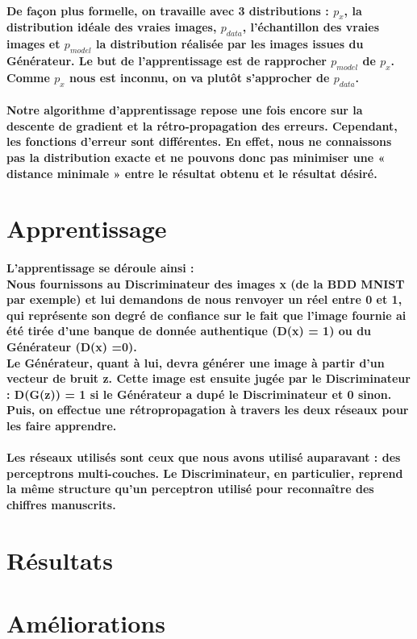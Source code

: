 \paragraph{De façon plus formelle, on travaille avec 3 distributions : $p_x$, la distribution idéale des vraies images, $p_{data}$, l’échantillon des vraies images et $p_{model}$ la distribution réalisée par les images issues du Générateur. Le but de l’apprentissage est de rapprocher $p_{model}$ de $p_x$. Comme $p_x$ nous est inconnu, on va plutôt s'approcher de $p_{data}$. }

\paragraph{Notre algorithme d’apprentissage repose une fois encore sur la descente de gradient et la rétro-propagation des erreurs. Cependant, les fonctions d’erreur sont différentes. En effet, nous ne connaissons pas la distribution exacte et ne pouvons donc pas minimiser une « distance minimale » entre le résultat obtenu et le résultat désiré. }

\section{Apprentissage}
\paragraph{L’apprentissage se déroule ainsi :\\
Nous fournissons au Discriminateur des images x (de la BDD MNIST par exemple) et lui demandons de nous renvoyer un réel entre 0 et 1, qui représente son degré de confiance sur le fait que l’image fournie ai été tirée d’une banque de donnée authentique (D(x) = 1) ou du Générateur (D(x) =0).\\
Le Générateur, quant à lui, devra générer une image à partir d’un vecteur de bruit z. Cette image est ensuite jugée par le Discriminateur : D(G(z)) = 1 si le Générateur a dupé le Discriminateur et 0 sinon. Puis, on effectue une rétropropagation à travers les deux réseaux pour les faire apprendre.}
\paragraph{
Les réseaux utilisés sont ceux que nous avons utilisé auparavant : des perceptrons multi-couches. Le Discriminateur, en particulier, reprend la même structure qu’un perceptron utilisé pour reconnaître des chiffres manuscrits.
}

\section{Résultats}


\section{Améliorations}

